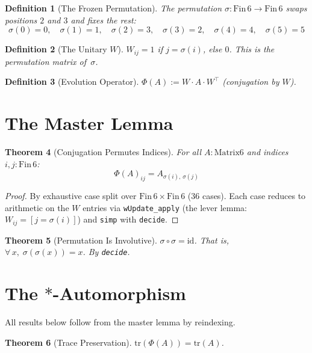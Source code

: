 \documentclass[12pt,a4paper]{article}
\newtheorem{theorem}{Theorem}[section]
\newtheorem{definition}[theorem]{Definition}
\begin{document}
\begin{definition}[The Frozen Permutation]
The permutation $\sigma : \mathrm{Fin}\, 6 \to \mathrm{Fin}\, 6$
swaps positions $2$ and $3$ and fixes the rest:
\[
\sigma(0) = 0, \quad \sigma(1) = 1, \quad \sigma(2) = 3, \quad
\sigma(3) = 2, \quad \sigma(4) = 4, \quad \sigma(5) = 5
\]
\end{definition}

\begin{definition}[The Unitary $W$]
$W_{ij} = 1$ if $j = \sigma(i)$, else $0$. This is the permutation
matrix of~$\sigma$.
\end{definition}

\begin{definition}[Evolution Operator]
$\Phi(A) := W \cdot A \cdot W^\top$ (conjugation by $W$).
\end{definition}

\section{The Master Lemma}

\begin{theorem}[Conjugation Permutes Indices]\label{thm:master}
For all $A : \text{Matrix6}$ and indices $i, j : \mathrm{Fin}\, 6$:
\[
\Phi(A)_{ij} = A_{\sigma(i),\, \sigma(j)}
\]
\end{theorem}

\begin{proof}
By exhaustive case split over $\mathrm{Fin}\, 6 \times \mathrm{Fin}\, 6$
(36 cases). Each case reduces to arithmetic on the $W$ entries via
\texttt{wUpdate\_apply} (the lever lemma: $W_{ij} = [j = \sigma(i)]$)
and \texttt{simp} with \texttt{decide}.
\end{proof}

\begin{theorem}[Permutation Is Involutive]\label{thm:invol-perm}
$\sigma \circ \sigma = \mathrm{id}$. That is, $\forall\, x,\;
\sigma(\sigma(x)) = x$. By \texttt{decide}.
\end{theorem}

\section{The $*$-Automorphism}

All results below follow from the master lemma by reindexing.

\begin{theorem}[Trace Preservation]\label{thm:trace}
$\mathrm{tr}(\Phi(A)) = \mathrm{tr}(A)$.
\end{theorem}
\end{document}
